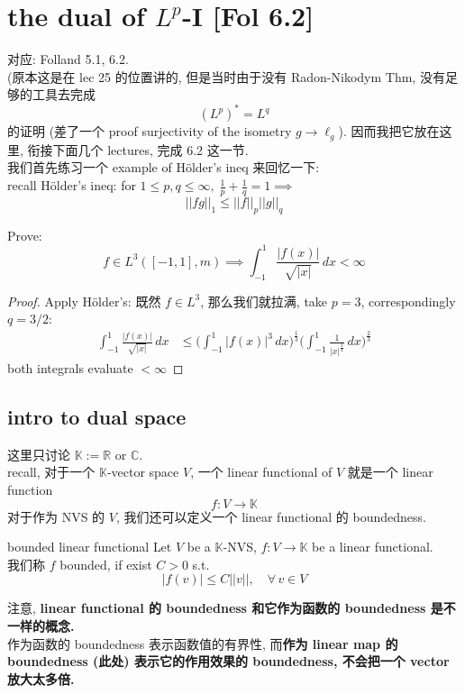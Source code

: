 \documentclass[lang=cn,11pt]{elegantbook}
\begin{document}
\chapter{the dual of $L^p$-I [Fol 6.2]}
对应: Folland 5.1, 6.2.\\
(原本这是在 lec 25 的位置讲的, 但是当时由于没有 Radon-Nikodym Thm, 没有足够的工具去完成 \[
(L^p)^* = L^q
\]
的证明 (差了一个 proof surjectivity of the isometry $g \to \ell_g$).  因而我把它放在这里, 衔接下面几个 lectures, 完成 6.2 这一节.\\
我们首先练习一个 example of Hölder's ineq 来回忆一下:\\
recall Hölder's ineq: for $1\leq p,q\leq\infty,\; \frac{1}{p}+\frac{1}{q} = 1\implies$ \[
||fg||_1 \leq ||f||_p ||g||_q
\]
\begin{example}
Prove:\[
    f \in L^3 ([-1,1],m)\implies \int_{-1}^1 \frac{|f(x)|}{\sqrt{|x|}} \,dx < \infty
    \]
\begin{proof}
    Apply Hölder's: 既然 $f\in L^3$, 那么我们就拉满, take $p=3$, correspondingly $ q=3/2$:\begin{align}
        \int_{-1}^1 \frac{|f(x)|}{\sqrt{|x|}} \,dx   &\leq \bigg(\int_{-1}^1 |f(x)|^3\, dx\bigg)^\frac{1}{3} \bigg(\int_{-1}^1  \frac{1}{|x|^{\frac{3}{4}}} \,dx    \bigg)^\frac{2}{3}
    \end{align} both integrals evaluate $<\infty$
\end{proof}
\end{example}

\section{intro to dual space}
这里只讨论 $\mathbb{K} := \mathbb{R}$ or $\mathbb{C}$.\\
recall, 对于一个 $\mathbb{K}$-vector space $V$, 一个 linear functional of $V$ 就是一个 linear function \[
f:V \to \mathbb{K}
\]
对于作为 NVS 的 $V$, 我们还可以定义一个 linear functional 的 boundedness. 
\begin{definition}{bounded linear functional }
 Let $V$ be a $\mathbb{K}$-NVS, $f:V \to \mathbb{K}$ be a linear functional.\\
 我们称 $f$ bounded, if exist $C>0$ s.t. \[
|f(v)| \leq C||v||,\quad \forall \,v \in V
\]
\end{definition}
\begin{remark}
注意, \textbf{linear functional 的 boundedness 和它作为函数的 boundedness 是不一样的概念.}\\
作为函数的 boundedness 表示函数值的有界性, 而\textbf{作为  linear map 的 boundedness (此处) 表示它的作用效果的 boundedness, 不会把一个 vector 放大太多倍.}
\end{remark}
\end{document}
